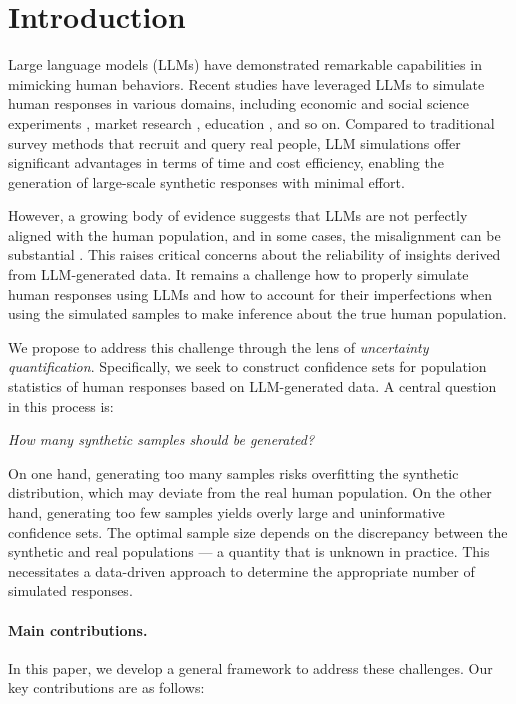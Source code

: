 \section{Introduction}

Large language models (LLMs) have demonstrated remarkable capabilities in mimicking human behaviors. Recent studies have leveraged LLMs to simulate human responses in various domains, including economic and social science experiments \citep{AAK23, Hor23, CLS23, BCD24, HYZ24, YLW24, ZHS24}, market research \citep{BIN23, GTo23, GSi24, WZZ24}, education \citep{ZMT23, LWa24}, and so on. Compared to traditional survey methods that recruit and query real people, LLM simulations offer significant advantages in terms of time and cost efficiency, enabling the generation of large-scale synthetic responses with minimal effort.

However, a growing body of evidence suggests that LLMs are not perfectly aligned with the human population, and in some cases, the misalignment can be substantial \citep{AAK23, SDL23}. This raises critical concerns about the reliability of insights derived from LLM-generated data. It remains a challenge how to properly simulate human responses using LLMs and how to account for their imperfections when using the simulated samples to make inference about the true human population.

We propose to address this challenge through the lens of \emph{uncertainty quantification}. Specifically, we seek to construct confidence sets for population statistics of human responses based on LLM-generated data. A central question in this process is:
\begin{center}
\emph{How many synthetic samples should be generated?}
\end{center}
On one hand, generating too many samples risks overfitting the synthetic distribution, which may deviate from the real human population. On the other hand, generating too few samples yields overly large and uninformative confidence sets. The optimal sample size depends on the discrepancy between the synthetic and real populations --- a quantity that is unknown in practice. This necessitates a data-driven approach to determine the appropriate number of simulated responses.


\paragraph{Main contributions.} In this paper, we develop a general framework to address these challenges. Our key contributions are as follows:

